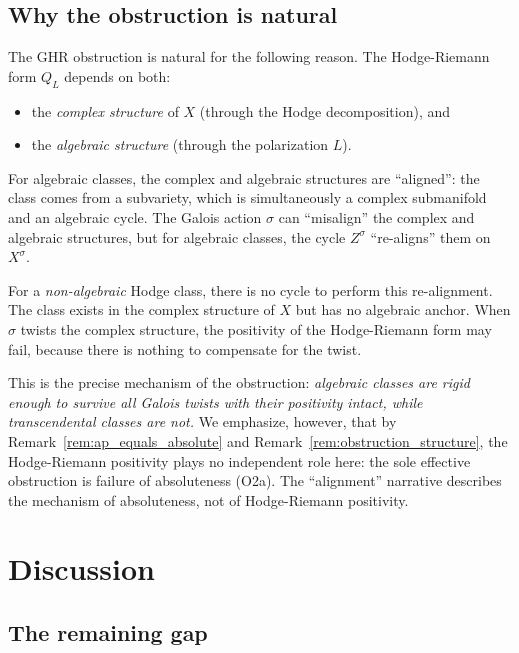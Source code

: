 \documentclass[aps,prd,twocolumn,superscriptaddress,nofootinbib]{revtex4-2}
\theoremstyle{definition}
\theoremstyle{remark}
\begin{document}
\subsection{Why the obstruction is natural}

The GHR obstruction is natural for the following reason. The Hodge-Riemann form $Q_L$ depends on both:
\begin{itemize}
\item the \textit{complex structure} of $X$ (through the Hodge decomposition), and
\item the \textit{algebraic structure} (through the polarization $L$).
\end{itemize}

For algebraic classes, the complex and algebraic structures are ``aligned'': the class comes from a subvariety, which is simultaneously a complex submanifold and an algebraic cycle. The Galois action $\sigma$ can ``misalign'' the complex and algebraic structures, but for algebraic classes, the cycle $Z^\sigma$ ``re-aligns'' them on $X^\sigma$.

For a \textit{non-algebraic} Hodge class, there is no cycle to perform this re-alignment. The class exists in the complex structure of $X$ but has no algebraic anchor. When $\sigma$ twists the complex structure, the positivity of the Hodge-Riemann form may fail, because there is nothing to compensate for the twist.

This is the precise mechanism of the obstruction: \textit{algebraic classes are rigid enough to survive all Galois twists with their positivity intact, while transcendental classes are not.} We emphasize, however, that by Remark~\ref{rem:ap_equals_absolute} and Remark~\ref{rem:obstruction_structure}, the Hodge-Riemann positivity plays no independent role here: the sole effective obstruction is failure of absoluteness (O2a). The ``alignment'' narrative describes the mechanism of absoluteness, not of Hodge-Riemann positivity.


\section{Discussion}
\label{sec:discussion}

\subsection{The remaining gap}
\end{document}
